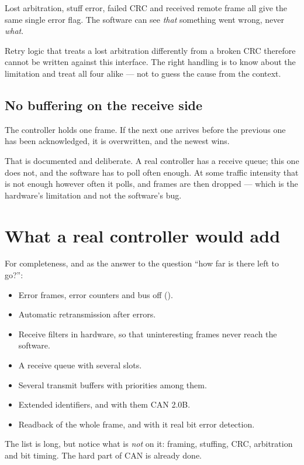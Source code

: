 Lost arbitration, stuff error, failed CRC and received remote frame all give the same single error
flag. The software can see \emph{that} something went wrong, never \emph{what}.

Retry logic that treats a lost arbitration differently from a broken CRC therefore cannot be written
against this interface. The right handling is to know about the limitation and treat all four
alike --- not to guess the cause from the context.

\subsection{No buffering on the receive side}

The controller holds one frame. If the next one arrives before the previous one has been
acknowledged, it is overwritten, and the newest wins.

That is documented and deliberate. A real controller has a receive queue; this one does not, and
the software has to poll often enough. At some traffic intensity that is not enough however often it
polls, and frames are then dropped --- which is the hardware's limitation and not the software's
bug.

\section{What a real controller would add}

For completeness, and as the answer to the question ``how far is there left to go?'':

\begin{itemize}
  \item Error frames, error counters and bus off ().
  \item Automatic retransmission after errors.
  \item Receive filters in hardware, so that uninteresting frames never reach the software.
  \item A receive queue with several slots.
  \item Several transmit buffers with priorities among them.
  \item Extended identifiers, and with them CAN 2.0B.
  \item Readback of the whole frame, and with it real bit error detection.
\end{itemize}

The list is long, but notice what is \emph{not} on it: framing, stuffing, CRC, arbitration and bit
timing. The hard part of CAN is already done.


